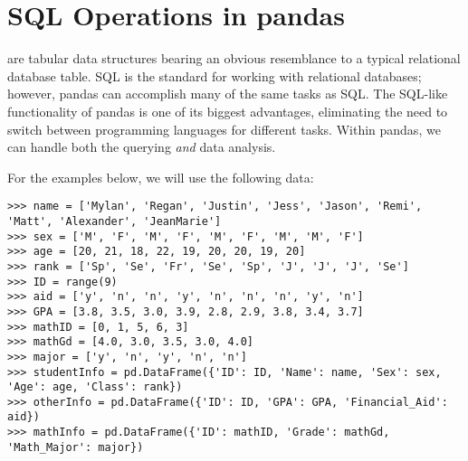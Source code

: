 \begin{comment}
The random walk is shown in Figure \ref{fig:PandasRandomWalk}.

\begin{figure}
\centering
\texttt{[image: randomWalk.pdf]}
\caption{Random walk of length 1000.}
\label{fig:PandasRandomWalk}
\end{figure}

\begin{problem}
Create five random walks of length 100, and plot them together in the same plot.

Next, create a ``biased'' random walk by changing the coin flip probability of head from 0.5 to 0.51.
Plot this biased walk with lengths 100, 10000, and then 100000.
Notice the definite trend that emerges.
Your results should be comparable to those in Figure \ref{pandas:biasedRandomWalk}.
\end{problem}

\begin{figure}
\centering
\texttt{[image: biasedRandomWalk.pdf]}
\caption{Biased random walk of length 100 (above) and 10000 (below).}
\label{pandas:biasedRandomWalk}
\end{figure}
\end{comment}

\section*{SQL Operations in pandas} %

 are tabular data structures bearing an obvious resemblance to a typical relational
database table.
SQL is the standard for working with relational databases; however, pandas can accomplish many of the same tasks as SQL.
The SQL-like functionality of pandas is
one of its biggest advantages, eliminating the need to switch between programming languages
for different tasks.
Within pandas, we can handle both the querying \emph{and} data analysis.

For the examples below, we will use the following data:
\begin{lstlisting}
>>> name = ['Mylan', 'Regan', 'Justin', 'Jess', 'Jason', 'Remi', 'Matt', 'Alexander', 'JeanMarie']
>>> sex = ['M', 'F', 'M', 'F', 'M', 'F', 'M', 'M', 'F']
>>> age = [20, 21, 18, 22, 19, 20, 20, 19, 20]
>>> rank = ['Sp', 'Se', 'Fr', 'Se', 'Sp', 'J', 'J', 'J', 'Se']
>>> ID = range(9)
>>> aid = ['y', 'n', 'n', 'y', 'n', 'n', 'n', 'y', 'n']
>>> GPA = [3.8, 3.5, 3.0, 3.9, 2.8, 2.9, 3.8, 3.4, 3.7]
>>> mathID = [0, 1, 5, 6, 3]
>>> mathGd = [4.0, 3.0, 3.5, 3.0, 4.0]
>>> major = ['y', 'n', 'y', 'n', 'n']
>>> studentInfo = pd.DataFrame({'ID': ID, 'Name': name, 'Sex': sex, 'Age': age, 'Class': rank})
>>> otherInfo = pd.DataFrame({'ID': ID, 'GPA': GPA, 'Financial_Aid': aid})
>>> mathInfo = pd.DataFrame({'ID': mathID, 'Grade': mathGd, 'Math_Major': major})
\end{lstlisting}

